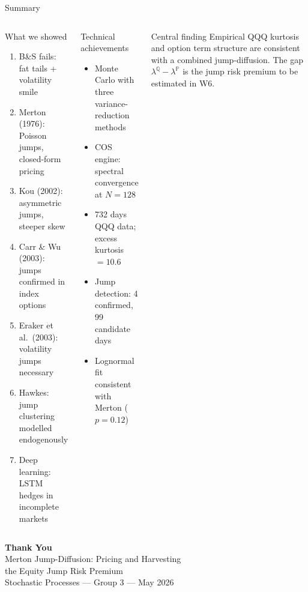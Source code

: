 \documentclass[aspectratio=169,10pt]{beamer}
\begin{document}
\begin{frame}{Summary}
\begin{columns}[T]
\begin{block}{What we showed}
\footnotesize
\begin{enumerate}\itemsep2pt
  \item B\&S fails: fat tails + volatility smile
  \item Merton (1976): Poisson jumps, closed-form pricing
  \item Kou (2002): asymmetric jumps, steeper skew
  \item Carr \& Wu (2003): jumps confirmed in index options
  \item Eraker et al.\ (2003): volatility jumps necessary
  \item Hawkes: jump clustering modelled endogenously
  \item Deep learning: LSTM hedges in incomplete markets
\end{enumerate}
\end{block}

\begin{block}{Technical achievements}
\footnotesize
\begin{itemize}\itemsep2pt
  \item Monte Carlo with three variance-reduction methods
  \item COS engine: spectral convergence at $N=128$
  \item 732 days QQQ data; excess kurtosis $= 10.6$
  \item Jump detection: 4 confirmed, 99 candidate days
  \item Lognormal fit consistent with Merton ($p=0.12$)
\end{itemize}
\end{block}

\begin{alertblock}{Central finding}
\footnotesize Empirical QQQ kurtosis and option term structure are consistent with a combined jump-diffusion. The gap $\lambda^{\mathbb{Q}} - \lambda^{\mathbb{P}}$ is the jump risk premium to be estimated in W6.
\end{alertblock}
\end{columns}
\end{frame}

{
\begin{frame}[plain]
\begin{center}
  \vspace{1.8cm}
  {\Large\bfseries\color{darkblue} Thank You}\\[0.8cm]
  {\normalsize Merton Jump-Diffusion: Pricing and Harvesting\\
   the Equity Jump Risk Premium}\\[0.6cm]
  {\small Stochastic Processes --- Group 3 --- May 2026}
\end{center}
\end{frame}
}
\end{document}

